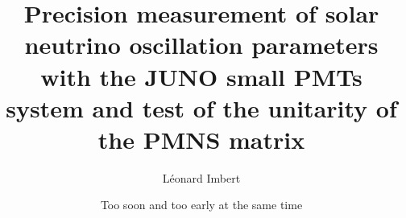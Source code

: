 





\author{L\'{e}onard Imbert}

\title{Precision measurement of solar neutrino oscillation parameters with the JUNO small PMTs system and test of the unitarity of the PMNS matrix}

\date{Too soon and too early at the same time}



